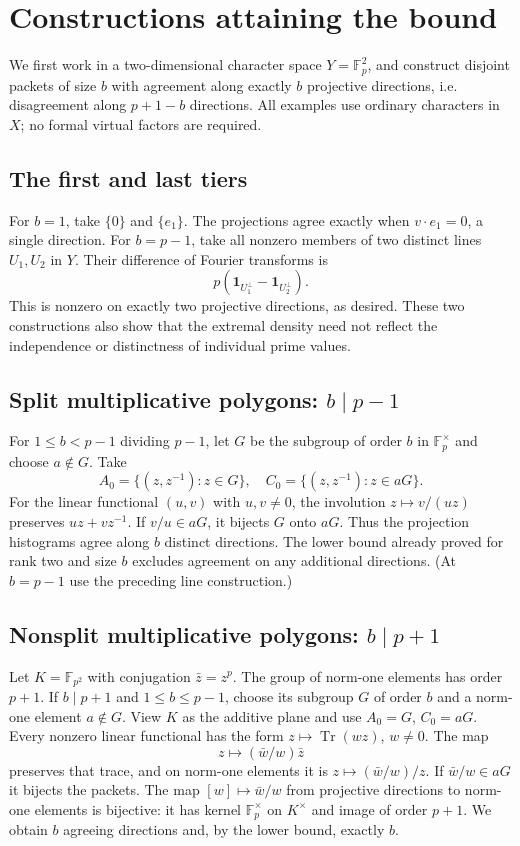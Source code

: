 \documentclass[11pt]{article}
\theoremstyle{definition}\newtheorem{definition}[theorem]{Definition}
\theoremstyle{remark}\newtheorem{remark}[theorem]{Remark}
\newcommand{\F}{\mathbb F}
\newcommand{\Tr}{\operatorname{Tr}}
\begin{document}
\section{Constructions attaining the bound}
We first work in a two-dimensional character space $Y=\F_p^2$, and construct disjoint packets of size $b$ with agreement along exactly $b$ projective directions, i.e. disagreement along $p+1-b$ directions. All examples use ordinary characters in $X$; no formal virtual factors are required.

\subsection{The first and last tiers}
For $b=1$, take $\{0\}$ and $\{e_1\}$. The projections agree exactly when $v\cdot e_1=0$, a single direction. For $b=p-1$, take all nonzero members of two distinct lines $U_1,U_2$ in $Y$. Their difference of Fourier transforms is
\[
 p(\mathbf1_{U_1^\perp}-\mathbf1_{U_2^\perp}).
\]
This is nonzero on exactly two projective directions, as desired. These two constructions also show that the extremal density need not reflect the independence or distinctness of individual prime values.

\subsection{Split multiplicative polygons: \texorpdfstring{$b\mid p-1$}{b divides p-1}}
For $1\le b<p-1$ dividing $p-1$, let $G$ be the subgroup of order $b$ in $\F_p^\times$ and choose $a\notin G$. Take
\[
 A_0=\{(z,z^{-1}):z\in G\},\quad C_0=\{(z,z^{-1}):z\in aG\}.
\]
For the linear functional $(u,v)$ with $u,v\ne0$, the involution $z\mapsto v/(uz)$ preserves $uz+vz^{-1}$. If $v/u\in aG$, it bijects $G$ onto $aG$. Thus the projection histograms agree along $b$ distinct directions. The lower bound already proved for rank two and size $b$ excludes agreement on any additional directions. (At $b=p-1$ use the preceding line construction.)

\subsection{Nonsplit multiplicative polygons: \texorpdfstring{$b\mid p+1$}{b divides p+1}}
Let $K=\F_{p^2}$ with conjugation $\bar z=z^p$. The group of norm-one elements has order $p+1$. If $b\mid p+1$ and $1\le b\le p-1$, choose its subgroup $G$ of order $b$ and a norm-one element $a\notin G$. View $K$ as the additive plane and use $A_0=G$, $C_0=aG$. Every nonzero linear functional has the form $z\mapsto\Tr(wz)$, $w\ne0$. The map
\[
 z\longmapsto (\bar w/w)\bar z
\]
preserves that trace, and on norm-one elements it is $z\mapsto(\bar w/w)/z$. If $\bar w/w\in aG$ it bijects the packets. The map $[w]\mapsto\bar w/w$ from projective directions to norm-one elements is bijective: it has kernel $\F_p^\times$ on $K^\times$ and image of order $p+1$. We obtain $b$ agreeing directions and, by the lower bound, exactly $b$.
\end{document}
